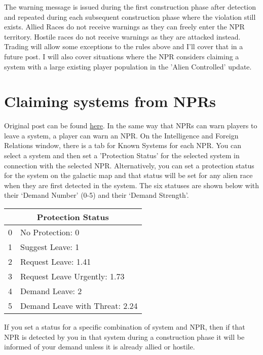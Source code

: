 \documentclass[../Aurora C# unofficial manual.tex]{subfiles}
\begin{document}
	The warning message is issued during the first construction phase after detection and repeated during each subsequent construction phase where the violation still exists. Allied Races do not receive warnings as they can freely enter the NPR territory. Hostile races do not receive warnings as they are attacked instead. Trading will allow some exceptions to the rules above and I'll cover that in a future post. I will also cover situations where the NPR considers claiming a system with a large existing player population in the 'Alien Controlled' update.
	
	\section{Claiming systems from NPRs}\label{3_claiming_npr_systems}
	Original post can be found
	\href{http://aurora2.pentarch.org/index.php?topic=8495.msg118362#msg118362}{here}.
	\newline\newline
	In the same way that NPRs can warn players to leave a system, a player can warn an NPR. On the Intelligence and Foreign Relations window, there is a tab for Known Systems for each NPR. You can select a system and then set a 'Protection Status' for the selected system in connection with the selected NPR. Alternatively, you can set a protection status for the system on the galactic map and that status will be set for any alien race when they are first detected in the system. The six statuses are shown below with their ‘Demand Number’ (0-5) and their ‘Demand Strength’.
	
	\begin{center}
		\begin{tabular}{|l|l|}
			\hline
			\multicolumn{2}{|c|}{\textbf{Protection Status}} \\
			\hline
			0 & No Protection: 0 \\
			\hline
			1 & Suggest Leave: 1 \\
			\hline
			2 & Request Leave: 1.41 \\
			\hline
			3 & Request Leave Urgently: 1.73 \\
			\hline
			4 & Demand Leave: 2 \\
			\hline
			5 & Demand Leave with Threat: 2.24 \\
			\hline
		\end{tabular}
	\end{center}
	
	
	If you set a status for a specific combination of system and NPR, then if that NPR is detected by you in that system during a construction phase it will be informed of your demand unless it is already allied or hostile.
	
\end{document}
